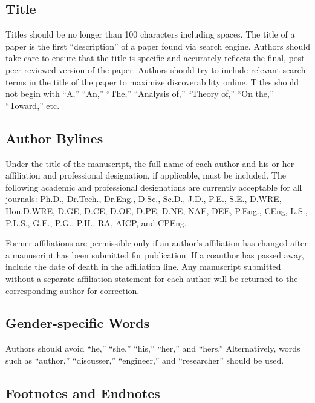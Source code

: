 \documentclass[Journal,LineNumbers]{ascelike-new}
\begin{document}
\subsection{Title}\label{title}

Titles should be no longer than 100 characters including spaces. The
title of a paper is the first ``description'' of a paper found via
search engine. Authors should take care to ensure that the title is
specific and accurately reflects the final, post-peer reviewed version
of the paper. Authors should try to include relevant search terms in the
title of the paper to maximize discoverability online. Titles should not
begin with ``A,'' ``An,'' ``The,'' ``Analysis of,'' ``Theory of,'' ``On
the,'' ``Toward,'' etc.

\subsection{Author Bylines}\label{author-bylines}

Under the title of the manuscript, the full name of each author and his
or her affiliation and professional designation, if applicable, must be
included. The following academic and professional designations are
currently acceptable for all journals: Ph.D., Dr.Tech., Dr.Eng., D.Sc.,
Sc.D., J.D., P.E., S.E., D.WRE, Hon.D.WRE, D.GE, D.CE, D.OE, D.PE, D.NE,
NAE, DEE, P.Eng., CEng, L.S., P.L.S., G.E., P.G., P.H., RA, AICP, and
CPEng.

Former affiliations are permissible only if an author's affiliation has
changed after a manuscript has been submitted for publication. If a
coauthor has passed away, include the date of death in the affiliation
line. Any manuscript submitted without a separate affiliation statement
for each author will be returned to the corresponding author for
correction.

\subsection{Gender-specific Words}\label{gender-specific-words}

Authors should avoid ``he,'' ``she,'' ``his,'' ``her,'' and ``hers.''
Alternatively, words such as ``author,'' ``discusser,'' ``engineer,''
and ``researcher'' should be used.

\subsection{Footnotes and Endnotes}\label{footnotes-and-endnotes}
\end{document}
